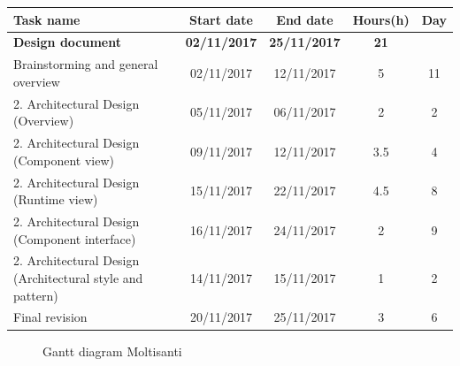 \begin{table}[h!]
	\begin{tabular}{lcccc}
		\toprule
		\textbf{Task name} & \textbf{Start date} & \textbf{End date} & \textbf{Hours(h)} & \textbf{Day} \\
		\midrule
		\textbf{Design document} & \textbf{02/11/2017} & \textbf{25/11/2017} & \textbf{21} &  \\
		Brainstorming and general overview & 02/11/2017 & 12/11/2017 & 5 & 11 \\
		2. Architectural Design (Overview) & 05/11/2017 & 06/11/2017 & 2 & 2 \\
		2. Architectural Design (Component view) & 09/11/2017 & 12/11/2017 & 3.5 & 4 \\
		2. Architectural Design (Runtime view) & 15/11/2017 & 22/11/2017 & 4.5 & 8 \\
		2. Architectural Design (Component interface) & 16/11/2017 & 24/11/2017 & 2 & 9 \\
		2. Architectural Design (Architectural style and pattern) & 14/11/2017 & 15/11/2017 & 1 & 2 \\
		\bottomrule
		Final revision & 20/11/2017 & 25/11/2017 & 3 & 6 \\
	\end{tabular}
\end{table}

\begin{figure}[!h]
	\centering
	\caption{Gantt diagram Moltisanti}
\end{figure}
\clearpage